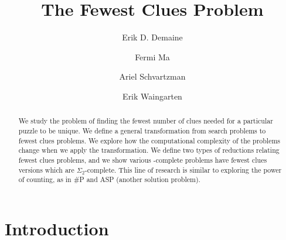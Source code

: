 \documentclass[runningheads,a4paper]{llncs}
\begin{document}
\mainmatter  %

\title{The Fewest Clues Problem}


%
%
\author{Erik D. Demaine \and Fermi Ma \and Ariel Schvartzman \and Erik Waingarten}
%


%
%

\maketitle

\begin{abstract}
We study the problem of finding the fewest number of clues needed for a particular puzzle to be unique. We define a general transformation from search problems to fewest clues problems. We explore how the computational complexity of the problems change when we apply the transformation. We define two types of reductions relating fewest clues problems, and we show various \NP-complete problems have fewest clues versions which are $\Sigma_2$-complete. This line of research is similar to exploring the power of counting, as in \#P and ASP (another solution problem).
\end{abstract}

\section{Introduction}
\label{sec:introduction}
\end{document}
